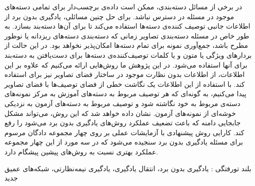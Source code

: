 


\pagestyle{empty}

در برخی از مسائل دسته‌بندی، ممکن است داده‌ی برچسب‌دار برای تمامی دسته‌های موجود در مسئله در دسترس نباشد. برای حل چنین مسائلی، یادگیری بدون برد از اطلاعات جانبی توصیف کننده‌ی دسته‌ها استفاده می‌کند تا برای آن‌ها دسته‌بند بسازد. به طور خاص در مسئله دسته‌بندی تصاویر زمانی که دسته‌بندی دسته‌های ریزدانه یا نوظور مطرح باشد، جمع‌آوری نمونه برای تمام دسته‌ها امکان‌پذیر نخواهد بود. در این حالت از بردارهای ویژگی یا متون و یا کلمات توصیف‌کننده‌ی دسته‌ها برای دست‌یافتن به دسته‌بند برای آنها استفاده می‌شود. در این پژوهش ما روش‌هایی ارائه می‌کنیم که علاوه بر این اطلاعات، از اطلاعات بدون نظارت موجود در ساختار فضای تصاویر نیز برای استفاده کند. با استفاده از این اطلاعات یک نگاشت خطی از فضای توصیف‌ها با فضای تصاویر پیدا می‌کنیم، به گونه‌ای که هر توصیف مربوط به دسته‌های آموزش به مرکز نمونه‌های دسته‌ی مربوط به خود نگاشته شود و توصیف مربوط به دسته‌های آزمون به نزدیکی خوشه‌ای از نمونه‌های آزمون. نشان داده خواهد شد که این روش،
می‌تواند مشکل جابجایی دامنه که باعث تضعیف عملکرد روش‌های یادگیری بدون برد می‌شود را رفع کند. کارایی روش پیشنهادی با آزمایشات عملی بر روی چهار مجموعه دادگان مرسوم برای مسئله یادگیری بدون برد سنجیده می‌شود که در سه مورد از این چهار مجموعه عملکرد بهتری نسبت به روش‌های پیشین پیشگام دارد.


‌بلند
‌تورفتگی : 
یادگیری بدون برد، انتقال یادگیری، یادگیری نیمه‌نظارتی، شبکه‌های عمیق
‌جدید
